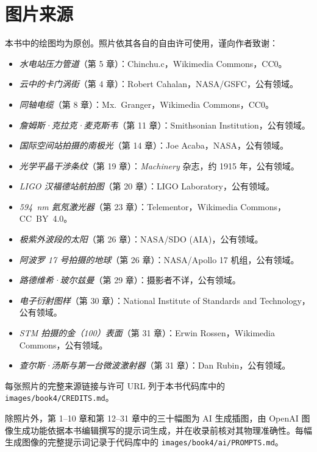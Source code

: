 \chapter*{图片来源}

本书中的绘图均为原创。照片依其各自的自由许可使用，谨向作者致谢：

\begin{itemize}
  \item \emph{水电站压力管道}（第 5 章）：Chinchu.c，Wikimedia Commons，CC0。
  \item \emph{云中的卡门涡街}（第 4 章）：Robert Cahalan，NASA/GSFC，公有领域。
  \item \emph{同轴电缆}（第 8 章）：Mx.~Granger，Wikimedia Commons，CC0。
  \item \emph{詹姆斯·克拉克·麦克斯韦}（第 11 章）：Smithsonian Institution，公有领域。
  \item \emph{国际空间站拍摄的南极光}（第 14 章）：Joe Acaba，NASA，公有领域。
  \item \emph{光学平晶干涉条纹}（第 19 章）：\emph{Machinery} 杂志，约 1915 年，公有领域。
  \item \emph{LIGO 汉福德站航拍图}（第 20 章）：LIGO Laboratory，公有领域。
  \item \emph{594~nm 氦氖激光器}（第 23 章）：Telementor，Wikimedia Commons，CC~BY~4.0。
  \item \emph{极紫外波段的太阳}（第 26 章）：NASA/SDO (AIA)，公有领域。
  \item \emph{阿波罗 17 号拍摄的地球}（第 26 章）：NASA/Apollo 17 机组，公有领域。
  \item \emph{路德维希·玻尔兹曼}（第 29 章）：摄影者不详，公有领域。
  \item \emph{电子衍射图样}（第 30 章）：National Institute of Standards and Technology，公有领域。
  \item \emph{STM 拍摄的金（100）表面}（第 31 章）：Erwin Rossen，Wikimedia Commons，公有领域。
  \item \emph{查尔斯·汤斯与第一台微波激射器}（第 31 章）：Dan Rubin，公有领域。
\end{itemize}

每张照片的完整来源链接与许可 URL 列于本书代码库中的 \texttt{images/book4/CREDITS.md}。

\bigskip
除照片外，第 1--10 章和第 12--31 章中的三十幅图为 AI 生成插图，由 OpenAI 图像生成功能依据本书编辑撰写的提示词生成，并在收录前核对其物理准确性。每幅生成图像的完整提示词记录于代码库中的 \texttt{images/book4/ai/PROMPTS.md}。
\clearpage
